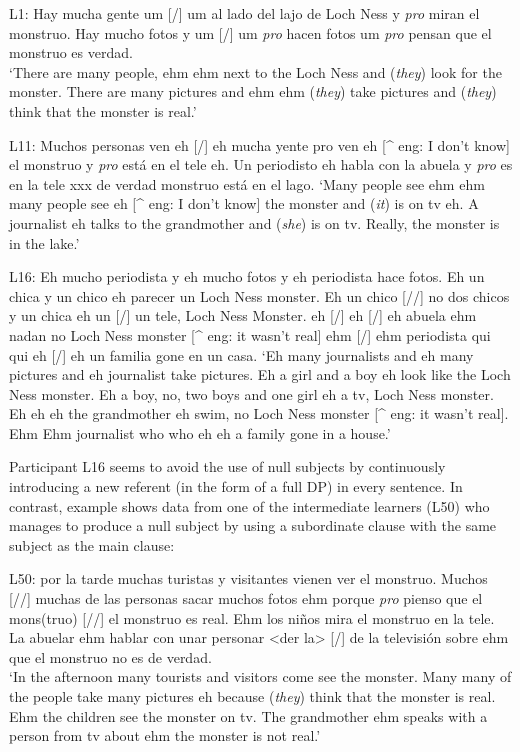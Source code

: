 \documentclass[output=paper]{langscibook}
\begin{document}
\ea%
    \label{ex:dominguez:13}
         L1: Hay mucha gente um [/] um al lado del lajo de Loch Ness y \textit{pro} miran el monstruo. Hay mucho fotos y um [/] um \textit{pro} hacen fotos um \textit{pro} pensan que el monstruo es verdad. \\
\glt `There are many people, ehm ehm next to the Loch Ness and (\textit{they}) look for the monster. There are many pictures and ehm ehm (\textit{they}) take pictures and (\textit{they}) think that the monster is real.'
\z


\ea%
    \label{ex:dominguez:14}
         L11: Muchos personas ven eh [/] eh mucha yente pro ven eh [\^{} eng: I don't know] el monstruo y \textit{pro} está en el tele eh. Un periodisto eh habla con la abuela y \textit{pro} es en la tele xxx de verdad monstruo está en el lago.
\glt `Many people see ehm ehm many people see eh [\^{} eng: I don't know] the monster and (\textit{it}) is on tv eh. A journalist eh talks to the grandmother and (\textit{she}) is on tv. Really, the monster is in the lake.'
\z

\ea%
    \label{ex:dominguez:15}
         L16: Eh mucho periodista y eh mucho fotos y eh periodista hace fotos. Eh un chica y un chico eh parecer un Loch Ness monster. Eh un chico [//] no dos chicos y un chica eh un [/] un tele, Loch Ness Monster. eh [/] eh [/] eh abuela ehm nadan no Loch Ness monster [\^{} eng: it wasn't real] ehm [/] ehm periodista qui qui eh [/] eh un familia gone en un casa.
\glt `Eh many journalists and eh many pictures and eh journalist take pictures. Eh a girl and a boy eh look like the Loch Ness monster. Eh a boy, no, two boys and one girl eh a tv, Loch Ness monster. Eh eh eh the grandmother eh swim, no Loch Ness monster [\^{} eng: it wasn't real]. Ehm Ehm journalist who who eh eh a family gone in a house.'
\z

Participant L16 seems to avoid the use of null subjects by continuously introducing a new referent (in the form of a full DP) in every sentence. In contrast, example  shows data from one of the intermediate learners (L50) who manages to produce a null subject by using a subordinate clause with the same subject as the main clause:


\ea%
    \label{ex:dominguez:16}
         L50: por la tarde muchas turistas y visitantes vienen ver el monstruo. Muchos [//] muchas de las personas sacar muchos fotos ehm porque \textit{pro} pienso que el mons(truo) [//] el monstruo es real. Ehm los niños mira el monstruo en la tele. La abuelar ehm hablar con unar personar <der la> [/] de la televisión sobre ehm que el monstruo no es de verdad.\\
\glt ‘In the afternoon many tourists and visitors come see the monster. Many many of the people take many pictures eh because (\textit{they}) think that the monster is real. Ehm the children see the monster on tv. The grandmother ehm speaks with a person from tv about ehm the monster is not real.’
\z
\end{document}
